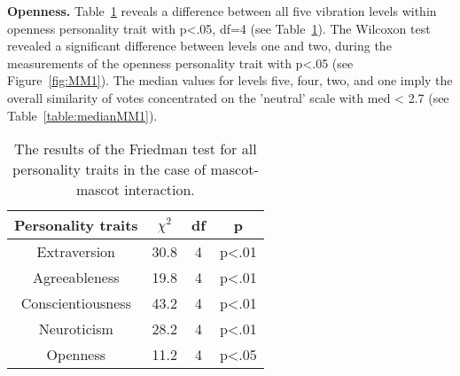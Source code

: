 \par\textbf{Openness.}
Table~\ref{table:friedmanMM1} reveals a difference between all five vibration levels within
openness personality trait with p<.05, df=4 (see Table~\ref{table:friedmanMM1}).
The Wilcoxon test revealed a significant difference between levels one and two,
during the measurements of the openness personality trait with p<.05 (see Figure~\ref{fig:MM1}).
The median values for levels five, four, two, and one imply the overall
similarity of votes concentrated on the 'neutral' scale with med < 2.7 (see Table~\ref{table:medianMM1}).

\begin{table}[hbt!]
    \renewcommand{\arraystretch}{1}
    \begin{center}
        \begin{tabular}{|c|c|c|c|}
            \hline
            \textbf{Personality traits} & \textbf{$\chi^2$} & \textbf{df} & \textbf{p} \\
            \hline
            Extraversion &30.8 &4 &p<.01 \\
            \hline
            Agreeableness &19.8 &4 &p<.01 \\
            \hline
            Conscientiousness & 43.2 &4 &p<.01 \\
            \hline
            Neuroticism &28.2 &4 &p<.01\\
            \hline
            Openness &11.2 &4 &p<.05 \\
            \hline
        \end{tabular}
        \caption{The results of the Friedman test for all personality traits in the case of mascot-mascot interaction.}
        \label{table:friedmanMM1}
    \end{center}
\end{table}


